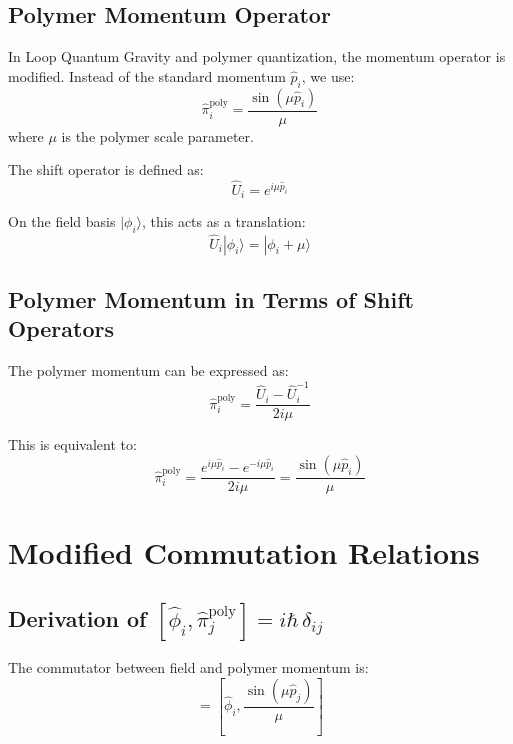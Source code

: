 \documentclass[12pt]{article}
\begin{document}
\subsection{Polymer Momentum Operator}

In Loop Quantum Gravity and polymer quantization, the momentum operator is modified. Instead of the standard momentum $\hat{p}_i$, we use:
\begin{equation}
\hat{\pi}_i^{\text{poly}} = \frac{\sin(\mu \hat{p}_i)}{\mu}
\end{equation}
where $\mu$ is the polymer scale parameter.

The shift operator is defined as:
\begin{equation}
\hat{U}_i = e^{i\mu \hat{p}_i}
\end{equation}

On the field basis $|\phi_i\rangle$, this acts as a translation:
\begin{equation}
\hat{U}_i |\phi_i\rangle = |\phi_i + \mu\rangle
\end{equation}

\subsection{Polymer Momentum in Terms of Shift Operators}

The polymer momentum can be expressed as:
\begin{equation}
\hat{\pi}_i^{\text{poly}} = \frac{\hat{U}_i - \hat{U}_i^{-1}}{2i\mu}
\end{equation}

This is equivalent to:
\begin{equation}
\hat{\pi}_i^{\text{poly}} = \frac{e^{i\mu \hat{p}_i} - e^{-i\mu \hat{p}_i}}{2i\mu} = \frac{\sin(\mu \hat{p}_i)}{\mu}
\end{equation}

\section{Modified Commutation Relations}

\subsection{Derivation of $[\hat{\phi}_i, \hat{\pi}_j^{\text{poly}}] = i\hbar\,\delta_{ij}$}

The commutator between field and polymer momentum is:
\begin{equation}
[\hat{\phi}_i, \hat{\pi}_j^{\text{poly}}] = [\hat{\phi}_i, \frac{\sin(\mu \hat{p}_j)}{\mu}]
\end{equation}
\end{document}
